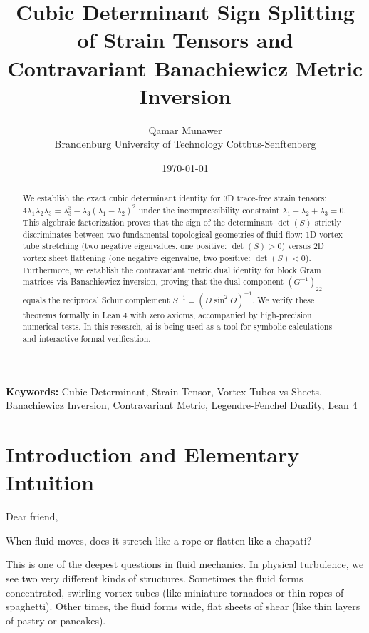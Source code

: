 \documentclass[11pt,a4paper]{article}
\title{\textbf{Cubic Determinant Sign Splitting of Strain Tensors and Contravariant Banachiewicz Metric Inversion}}
\author{Qamar Munawer \\ Brandenburg University of Technology Cottbus-Senftenberg}
\date{\today}
\theoremstyle{definition}
\begin{document}
\maketitle

\begin{abstract}
We establish the exact cubic determinant identity for 3D trace-free strain tensors: $4 \lambda_1 \lambda_2 \lambda_3 = \lambda_3^3 - \lambda_3 (\lambda_1 - \lambda_2)^2$ under the incompressibility constraint $\lambda_1 + \lambda_2 + \lambda_3 = 0$. This algebraic factorization proves that the sign of the determinant $\det(S)$ strictly discriminates between two fundamental topological geometries of fluid flow: 1D vortex tube stretching (two negative eigenvalues, one positive: $\det(S) > 0$) versus 2D vortex sheet flattening (one negative eigenvalue, two positive: $\det(S) < 0$). Furthermore, we establish the contravariant metric dual identity for block Gram matrices via Banachiewicz inversion, proving that the dual component $(G^{-1})_{22}$ equals the reciprocal Schur complement $S^{-1} = (D \sin^2 \Theta)^{-1}$. We verify these theorems formally in Lean 4 with zero axioms, accompanied by high-precision numerical tests. In this research, ai is being used as a tool for symbolic calculations and interactive formal verification.
\end{abstract}

\vspace{1em}
\noindent\textbf{Keywords:} Cubic Determinant, Strain Tensor, Vortex Tubes vs Sheets, Banachiewicz Inversion, Contravariant Metric, Legendre-Fenchel Duality, Lean 4

\section{Introduction and Elementary Intuition}

Dear friend,

When fluid moves, does it stretch like a rope or flatten like a chapati?

This is one of the deepest questions in fluid mechanics. In physical turbulence, we see two very different kinds of structures. Sometimes the fluid forms concentrated, swirling vortex tubes (like miniature tornadoes or thin ropes of spaghetti). Other times, the fluid forms wide, flat sheets of shear (like thin layers of pastry or pancakes).
\end{document}
